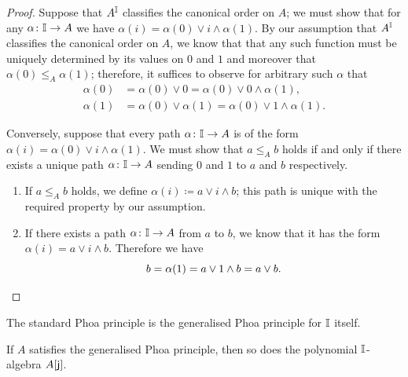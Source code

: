 \begin{proof}
  Suppose that $A^{\mathbb{I}}$ classifies the canonical order on $A$; we must show that for any $\alpha\colon \mathbb{I}\to A$ we have $\alpha(i) = \alpha(0)\vee i \wedge \alpha(1)$. By our assumption that $A^{\mathbb{I}}$ classifies the canonical order on $A$, we know that that any such function must be uniquely determined by its values on $0$ and $1$ and moreover that $\alpha(0) \le_A \alpha(1)$; therefore, it suffices to observe for arbitrary such $\alpha$ that
  \begin{align*}
    \alpha(0) &= \alpha(0) \vee 0 = \alpha(0)\vee 0 \wedge \alpha(1)\text{,}\\
    \alpha(1) &= \alpha(0)\vee\alpha(1) = \alpha(0)\vee 1 \wedge \alpha(1)\text{.}
  \end{align*}

  Conversely, suppose that every path $\alpha\colon \mathbb{I}\to A$ is of the form $\alpha(i) = \alpha(0)\vee i \wedge \alpha(1)$. We must show that $a\le_A b$ holds if and only if there exists a unique path $\alpha\colon \mathbb{I}\to A$ sending $0$ and $1$ to $a$ and $b$ respectively.
  \begin{enumerate}
    \item If $a\le_A b$ holds, we define $\alpha(i) \coloneq a\vee i \wedge b$; this path is unique with the required property by our assumption. 
    \item If there exists a path $\alpha\colon\mathbb{I}\to A$ from $a$ to $b$, we know that it has the form $\alpha(i) = a \vee i \wedge b$. Therefore we have
    \[ 
      b = \alpha(1) = a\vee 1\wedge b = a \vee b.
      \qedhere
    \] 
  \end{enumerate}
\end{proof}

The standard Phoa principle is the generalised Phoa principle for $\mathbb{I}$ itself.

\begin{theorem}\label{thm:gen-phoa-poly}
  If $A$ satisfies the generalised Phoa principle, then so does the polynomial $\mathbb{I}$-algebra $A[\mathsf{j}]$.
\end{theorem}


